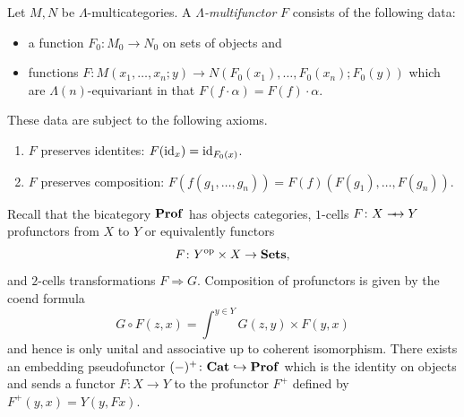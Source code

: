 \begin{Defi}
Let $M, N$ be $\Lambda$-multicategories. A \emph{$\Lambda$-multifunctor} $F$ consists of the following data:
\begin{itemize}
\item a function $F_{0} \colon M_{0} \rightarrow N_{0}$ on sets of objects and
\item functions $F \colon M(x_1, \ldots, x_n; y) \rightarrow N(F_{0}(x_1), \ldots, F_{0}(x_n); F_{0}(y))$ which are $\Lambda(n)$-equivariant in that $F(f \cdot \alpha) = F(f) \cdot \alpha$.
\end{itemize}
These data are subject to the following axioms.
\begin{enumerate}
\item $F$ preserves identites: $F(\textrm{id}_x) = \textrm{id}_{F_{0}(x)}$.
\item $F$ preserves composition: $F\left( f(g_1, \ldots, g_n) \right) = F(f) \left( F(g_1), \ldots, F(g_n) \right).$
\end{enumerate}
\end{Defi}



Recall that the bicategory $\mathbf{Prof}$ has objects categories, $1$-cells $F \colon X \srarrow Y$ profunctors from $X$ to $Y$ or equivalently functors
  \[
    F \colon Y^{\textrm{op}} \times X \rightarrow \mathbf{Sets},
  \]
and $2$-cells transformations $F \Rightarrow G$. Composition of profunctors is given by the coend formula
  \[
    G \circ F (z,x) = \int^{y \in Y} G(z,y) \times F(y,x)
  \]
and hence is only unital and associative up to coherent isomorphism. There exists an embedding pseudofunctor $(-)^{+} \colon  \mathbf{Cat} \hookrightarrow \mathbf{Prof}$ which is the identity on objects and sends a functor $F \colon X \rightarrow Y$ to the profunctor $F^{+}$ defined by $F^{+}(y,x) = Y(y,Fx)$.


